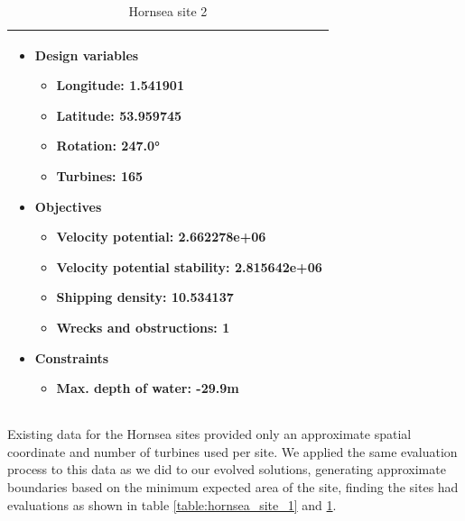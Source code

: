 \documentclass[preprint,12pt]{elsarticle}
\begin{document}
\begin{table}[h!]
    \centering
    \begin{tabular}{|p{}|}
        \hline
        \begin{itemize}
            \item Design variables
            \begin{itemize}
                \item Longitude: 1.541901
                \item Latitude: 53.959745
                \item Rotation: 247.0°
                \item Turbines: 165
            \end{itemize}
            \item Objectives
            \begin{itemize}
                \item Velocity potential: 2.662278e+06
                \item Velocity potential stability: 2.815642e+06
                \item Shipping density: 10.534137
                \item Wrecks and obstructions: 1
            \end{itemize}
            \item Constraints
            \begin{itemize}
                \item Max. depth of water: -29.9m
            \end{itemize}
        \end{itemize} \\
        \hline
    \end{tabular}
    \caption{Hornsea site 2}
    \label{table:hornsea_site_2}
\end{table}

Existing data for the Hornsea sites provided only an approximate spatial coordinate and number of turbines used per site. We applied the same evaluation process to this data as we did to our evolved solutions, generating approximate boundaries based on the minimum expected area of the site, finding the sites had evaluations as shown in table \ref{table:hornsea_site_1} and \ref{table:hornsea_site_2}.
\end{document}
